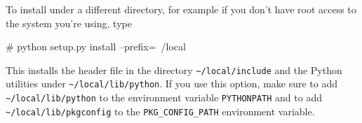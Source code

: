 To install \ufc{} under a different directory, for example if you
don't have root access to the system you're using, type
\begin{code}
# python setup.py install --prefix=~/local
\end{code}
This installs the \ufc{} header file in the directory
\texttt{\~{}/local/include} and the Python utilities under
\texttt{\~{}/local/lib/python}. If you use this option, make sure to
add \texttt{\~{}/local/lib/python} to the environment variable
\texttt{PYTHONPATH} and to add \texttt{\~{}/local/lib/pkgconfig} to
the \texttt{PKG\_CONFIG\_PATH} environment variable.

